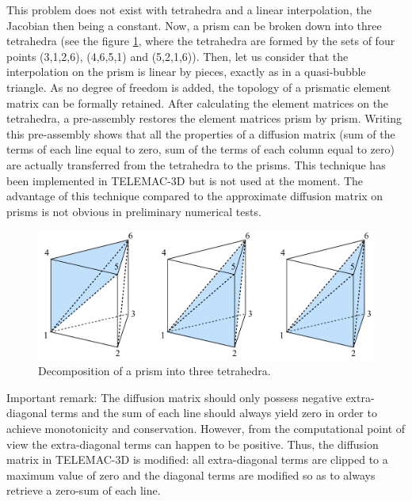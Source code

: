 This problem does not exist with tetrahedra and a linear interpolation,
the Jacobian then being a constant.
Now, a prism can be broken down into three tetrahedra (see the figure
\ref{decoupage prisme}, where the tetrahedra are formed by the sets of four
points (3,1,2,6), (4,6,5,1) and (5,2,1,6)). Then, let us consider that the
interpolation on the prism is linear by pieces, exactly as in a quasi-bubble
triangle.
As no degree of freedom is added, the topology of a prismatic element matrix
can be formally retained. After calculating the element matrices on the
tetrahedra, a pre-assembly restores the element matrices prism by prism.
Writing this pre-assembly shows that all the properties of a diffusion matrix
(sum of the terms of each line equal to zero, sum of the terms of each column
equal to zero) are actually transferred from the tetrahedra to the prisms.
This technique has been implemented in TELEMAC-3D but is not used at the moment.
The advantage of this technique compared to the
approximate diffusion matrix on prisms is not obvious in
preliminary numerical tests.
\begin{figure}[tbh]%
\centering
\includegraphics[scale=0.4]{graphics/prism_tetra.pdf}%
\caption{Decomposition of a prism into three tetrahedra.}%
\label{decoupage prisme}%
\end{figure}


\begin{CommentBlock}{Important remark:}
The diffusion matrix should only possess negative extra-diagonal terms
and the sum of each line should always yield zero in order
to achieve monotonicity and conservation.
However, from the computational point of view the extra-diagonal terms
can happen to be positive. Thus, the diffusion matrix in TELEMAC-3D
is modified: all extra-diagonal terms are clipped to a maximum value
of zero and the diagonal terms are modified so as to always retrieve
a zero-sum of each line. %
\end{CommentBlock}

